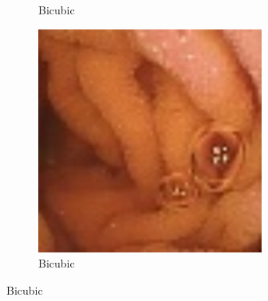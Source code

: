 \begin{figure}[H]
\begin{subfigure}[b]{0.275\textwidth}
    \caption{Bicubic}
  \end{subfigure}
  \begin{subfigure}[b]{0.275\textwidth}
    \includegraphics[width=\textwidth]{Chapter7/Bicubic_456.jpg}
    \caption{Bicubic}
  \end{subfigure}
  

\end{figure}
